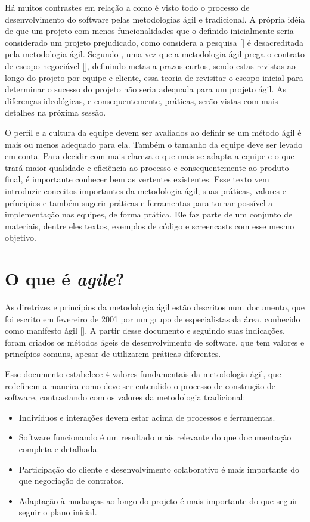 \documentclass[10pt,a4paper,font=plain]{abnt}
\begin{document}
Há muitos contrastes em relação a como é visto todo o processo de desenvolvimento do software pelas metodologias ágil e tradicional. A própria idéia de que um projeto com menos funcionalidades que o definido inicialmente seria considerado um projeto prejudicado, como considera a pesquisa [] é desacreditada pela metodologia ágil. Segundo , uma vez que a metodologia ágil prega o contrato de escopo negociável [], definindo metas a prazos curtos, sendo estas revistas ao longo do projeto por equipe e cliente, essa teoria de revisitar o escopo inicial para determinar o sucesso do projeto não seria adequada para um projeto ágil. As diferenças ideológicas, e consequentemente, práticas, serão vistas com mais detalhes na próxima sessão.

O perfil e a cultura da equipe devem ser avaliados ao definir se um método ágil é mais ou menos adequado para ela. Também o tamanho da equipe deve ser levado em conta. Para decidir com mais clareza o que mais se adapta a equipe e o que trará maior qualidade e eficiência ao processo e consequentemente ao produto final, é importante conhecer bem as vertentes existentes. Esse texto vem introduzir conceitos importantes da metodologia ágil, suas práticas, valores e príncipios e também sugerir práticas e ferramentas para tornar possível a implementação nas equipes, de forma prática. Ele faz parte de um conjunto de materiais, dentre eles textos, exemplos de código e screencasts com esse mesmo objetivo.

\section {O que é \textit{agile}?}

As diretrizes e princípios da metodologia ágil estão descritos num documento, que foi escrito em fevereiro de 2001 por um grupo de especialistas da área, conhecido como manifesto ágil []. A partir desse documento e seguindo suas indicações, foram criados os métodos ágeis de desenvolvimento de software, que tem valores e princípios comuns, apesar de utilizarem práticas diferentes.

Esse documento estabelece 4 valores fundamentais da metodologia ágil, que redefinem a maneira como deve ser entendido o processo de construção de software, contrastando com os valores da metodologia tradicional:

\begin{itemize}
\item Indivíduos e interações devem estar acima de processos e ferramentas. 
\item Software funcionando é um resultado mais relevante do que documentação completa e detalhada.
\item Participação do cliente e desenvolvimento colaborativo é mais importante do que negociação de contratos.
\item Adaptação à mudanças ao longo do projeto é mais importante do que seguir seguir o plano inicial.
\end{itemize}
\end{document}

